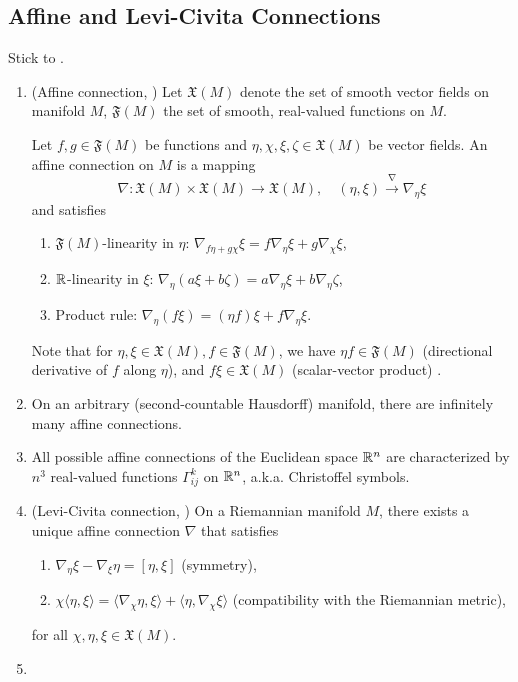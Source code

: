 \subsection{Affine and Levi-Civita Connections}
Stick to \cite{absil_2008_optimization}.
\begin{enumerate}
    \item (Affine connection, \cite[Section~5.2]{absil_2008_optimization}) Let $\mathfrak{X}(M)$ denote the set of smooth vector fields on manifold $M$, $\mathfrak{F}(M)$ the set of smooth, real-valued functions on $M$. 
    
    Let $f,g \in \mathfrak{F}(M)$ be functions and $\eta, \chi, \xi, \zeta \in \mathfrak{X}(M)$ be vector fields. An affine connection on $M$ is a mapping
    \[ \nabla: \mathfrak{X}(M) \times \mathfrak{X}(M) \to \mathfrak{X}(M),\quad (\eta, \xi) \overset{\nabla}{\to} \nabla_\eta \xi \]
    and satisfies
        \begin{enumerate}
            \item $\mathfrak{F}(M)$-linearity in $\eta$: $\nabla_{f\eta + g \chi} \xi = f \nabla_\eta \xi + g \nabla_\chi \xi$,
            \item $\mathbb{R}$-linearity in $\xi$: $\nabla_\eta (a\xi + b\zeta) = a \nabla_\eta \xi + b \nabla_\eta \zeta$,
            \item Product rule: $\nabla_\eta (f \xi) = (\eta f) \xi + f \nabla_\eta \xi$.
        \end{enumerate}
        Note that for $\eta,\xi \in \mathfrak{X}(M), f \in \mathfrak{F}(M)$, we have $\eta f \in \mathfrak{F}(M)$ (directional derivative of $f$ along $\eta$), and $f \xi \in \mathfrak{X}(M)$ (scalar-vector product) \cite[Section~3.5.4]{absil_2008_optimization}.
    \item On an arbitrary (second-countable Hausdorff) manifold, there are infinitely many affine connections.
    \item All possible affine connections of the Euclidean space $\mathbb{R}^n$ are characterized by $n^3$ real-valued functions $\Gamma^k_{ij}$ on $\mathbb{R}^n$, a.k.a. Christoffel symbols.
    \item (Levi-Civita connection, \cite[Theorem~5.3.1]{absil_2008_optimization}) On a Riemannian manifold $M$, there exists a unique affine connection $\nabla$ that satisfies
        \begin{enumerate}
            \item $\nabla_{\eta}\xi - \nabla_{\xi}\eta = [\eta,\xi]$ (symmetry),
            \item $\chi\langle \eta,\xi\rangle
                = \langle \nabla_{\chi}\eta,\xi\rangle + \langle \eta,\nabla_{\chi}\xi\rangle$ (compatibility with the Riemannian metric),
        \end{enumerate}
        for all $\chi,\eta,\xi \in \mathfrak{X}(M)$.
    \item {}
\end{enumerate}

